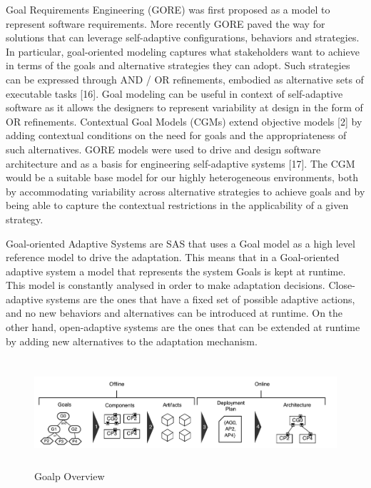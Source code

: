 \documentclass[conference]{IEEEtran}
\begin{document}
Goal Requirements Engineering (GORE) was first proposed as a model to represent software requirements. More recently GORE
paved the way for solutions that can leverage self-adaptive configurations, behaviors and strategies. In particular, goal-oriented modeling captures what stakeholders want to achieve in terms of the goals and alternative strategies they can adopt.  Such strategies can be expressed through AND / OR refinements, embodied as alternative sets of executable tasks [16]. Goal modeling can be useful in context of self-adaptive software as it allows the designers to represent variability at design in the form of OR refinements. Contextual Goal Models (CGMs) extend objective models [2] by adding contextual conditions on the need for goals and the appropriateness of such alternatives. GORE models were used to drive and design software architecture and as a basis for engineering self-adaptive systems [17]. The CGM would be a suitable base model for our highly heterogeneous environments, both by accommodating variability across alternative strategies to achieve goals and by being able to capture the contextual restrictions in the applicability of a given strategy.

Goal-oriented Adaptive Systems are SAS that uses a Goal model as a high level reference model to drive the adaptation. This means that in a Goal-oriented adaptive system a model that represents the system Goals is kept at runtime. This model is constantly analysed in order to make adaptation decisions. Close-adaptive systems are the ones that have a fixed set of possible adaptive actions, and no new behaviors and alternatives can be introduced at runtime. On the other hand, open-adaptive systems are the ones that can be extended at runtime by adding new alternatives to the adaptation mechanism.  

\begin{figure}[t]
\includegraphics[width=\textwidth,height=4cm]{images/transformations}
\caption{Goalp Overview \cite{rodrigues_autonomic_2016} }
\label{fig:overview}
\end{figure}
\end{document}
